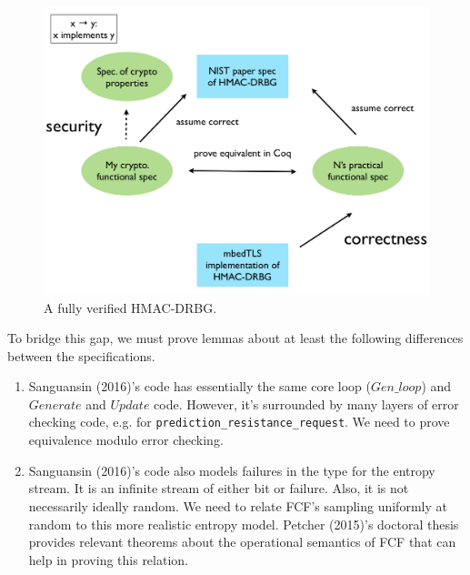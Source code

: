 \documentclass[12pt,lot, lof]{puthesis}
\newcommand{\li} {\lstinline}
\begin{document}
{\begin{figure}
  \includegraphics[width=\linewidth]{images/project_diagram.png}
  \caption{A fully verified HMAC-DRBG.}
  \label{fig:project_diagram}
\end{figure}


To bridge this gap, we must prove lemmas about at least the following differences between the specifications.

\begin{enumerate}
\item Sanguansin (2016)'s code has essentially the same core loop ($Gen\_loop$) and $Generate$ and $Update$ code. However, it's surrounded by many layers of error checking code, e.g. for \li|prediction_resistance_request|. We need to prove equivalence modulo error checking.
\item Sanguansin (2016)'s code also models failures in the type for the entropy stream. It is an infinite stream of either bit or failure. Also, it is not necessarily ideally random. We need to relate FCF's sampling uniformly at random to this more realistic entropy model. Petcher (2015)'s doctoral thesis provides relevant theorems about the operational semantics of FCF that can help in proving this relation.
\end{enumerate}

}
\end{document}
